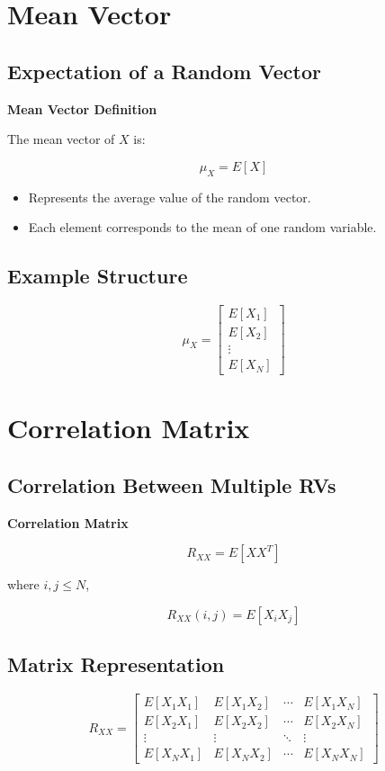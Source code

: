 \documentclass[12pt]{article}
\begin{document}
\section{Mean Vector}

\subsection{Expectation of a Random Vector}

\textbf{Mean Vector Definition}

The mean vector of $X$ is:

\[
\mu_X = E[X]
\]

\begin{itemize}
    \item Represents the average value of the random vector.
    \item Each element corresponds to the mean of one random variable.
\end{itemize}

\subsection{Example Structure}

\[
\mu_X =
\begin{bmatrix}
E[X_1] \\
E[X_2] \\
\vdots \\
E[X_N]
\end{bmatrix}
\]

\section{Correlation Matrix}

\subsection{Correlation Between Multiple RVs}

\textbf{Correlation Matrix}

\[
R_{XX} = E[X X^T]
\]

where $i, j \leq N$,

\[
R_{XX}(i,j) = E[X_i X_j]
\]

\subsection{Matrix Representation}

\[
R_{XX} =
\begin{bmatrix}
E[X_1 X_1] & E[X_1 X_2] & \cdots & E[X_1 X_N] \\
E[X_2 X_1] & E[X_2 X_2] & \cdots & E[X_2 X_N] \\
\vdots & \vdots & \ddots & \vdots \\
E[X_N X_1] & E[X_N X_2] & \cdots & E[X_N X_N]
\end{bmatrix}
\]
\end{document}

